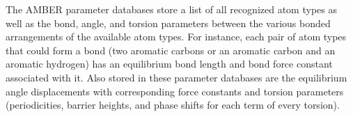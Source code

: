 The AMBER parameter databases store a list of all recognized atom types as well
as the bond, angle, and torsion parameters between the various bonded
arrangements of the available atom types. For instance, each pair of atom types
that could form a bond (\eg two aromatic carbons or an aromatic carbon and an
aromatic hydrogen) has an equilibrium bond length and bond force constant
associated with it. Also stored in these parameter databases are the equilibrium
angle displacements with corresponding force constants and torsion parameters
(periodicities, barrier heights, and phase shifts for each term of every
torsion).

